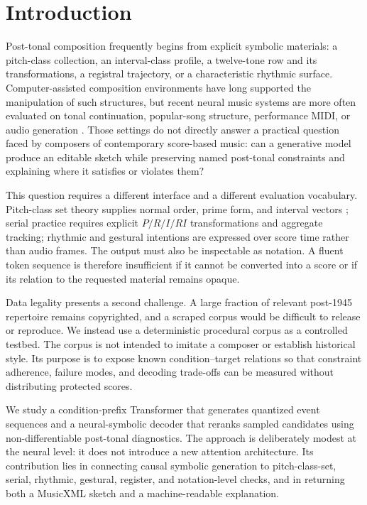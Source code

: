 \section{Introduction}
\label{sec:introduction}

Post-tonal composition frequently begins from explicit symbolic materials: a pitch-class collection, an interval-class profile, a twelve-tone row and its transformations, a registral trajectory, or a characteristic rhythmic surface. Computer-assisted composition environments have long supported the manipulation of such structures, but recent neural music systems are more often evaluated on tonal continuation, popular-song structure, performance MIDI, or audio generation \citep{assayag1999openmusic,briot2020deep}. Those settings do not directly answer a practical question faced by composers of contemporary score-based music: can a generative model produce an editable sketch while preserving named post-tonal constraints and explaining where it satisfies or violates them?

This question requires a different interface and a different evaluation vocabulary. Pitch-class set theory supplies normal order, prime form, and interval vectors \citep{forte1973structure,straus2016posttonal}; serial practice requires explicit $P/R/I/RI$ transformations and aggregate tracking; rhythmic and gestural intentions are expressed over score time rather than audio frames. The output must also be inspectable as notation. A fluent token sequence is therefore insufficient if it cannot be converted into a score or if its relation to the requested material remains opaque.

Data legality presents a second challenge. A large fraction of relevant post-1945 repertoire remains copyrighted, and a scraped corpus would be difficult to release or reproduce. We instead use a deterministic procedural corpus as a controlled testbed. The corpus is not intended to imitate a composer or establish historical style. Its purpose is to expose known condition--target relations so that constraint adherence, failure modes, and decoding trade-offs can be measured without distributing protected scores.

We study a condition-prefix Transformer that generates quantized event sequences and a neural-symbolic decoder that reranks sampled candidates using non-differentiable post-tonal diagnostics. The approach is deliberately modest at the neural level: it does not introduce a new attention architecture. Its contribution lies in connecting causal symbolic generation to pitch-class-set, serial, rhythmic, gestural, register, and notation-level checks, and in returning both a MusicXML sketch and a machine-readable explanation.

